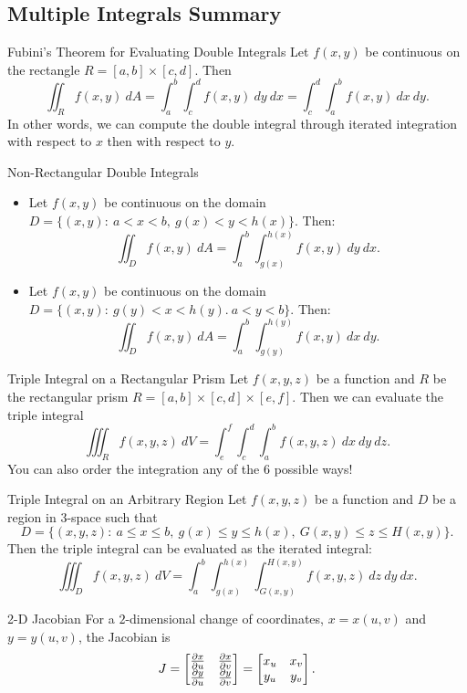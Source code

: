 \renewcommand\thesubsection{\thesection.\Alph{subsection}}
\setcounter{subsection}{18}
\subsection{Multiple Integrals Summary}
\begin{theorem}{Fubini's Theorem for Evaluating Double Integrals}
Let $f(x,y)$ be continuous on the rectangle $R=[a,b]\times[c,d]$. Then $$\iint_R f(x,y)\ dA=\int_{a}^{b}\int_{c}^{d}f(x,y)\ dy\ dx=\int_{c}^{d}\int_{a}^{b}f(x,y)\ dx\ dy.$$ In other words, we can compute the double integral through iterated integration with respect to $x$ then with respect to $y$.
\end{theorem}

\begin{definition}{Non-Rectangular Double Integrals}
\begin{itemize}
\item Let $f(x,y)$ be continuous on the domain $D=\{(x,y):\ a<x<b,\ g(x)<y<h(x) \}.$ Then: $$\iint_D f(x,y)\ dA=\int_{a}^{b}\int_{g(x)}^{h(x)}f(x,y)\ dy \ dx. $$
\item Let $f(x,y)$ be continuous on the domain $D=\{(x,y):\ g(y)<x<h(y).\ a<y<b \}. $ Then: $$\iint_{D}f(x,y)\ dA=\int_{a}^b\int_{g(y)}^{h(y)}f(x,y)\ dx \ dy. $$
\end{itemize}
\end{definition}

\begin{definition}{Triple Integral on a Rectangular Prism}
Let $f(x,y,z)$ be a function and $R$ be the rectangular prism $R=[a,b]\times[c,d]\times[e,f]$. Then we can evaluate the triple integral $$\iiint_R f(x,y,z)\ dV=\int_e^f\int_c^d\int_a^b f(x,y,z) \ dx \ dy \ dz.$$
You can also order the integration any of the 6 possible ways!
\end{definition}

\begin{definition}{Triple Integral on an Arbitrary Region}
Let $f(x,y,z)$ be a function and $D$ be a region in $3$-space such that $$D=\big\{(x,y,z): \ a\leq x\leq b,\ g(x)\leq y\leq h(x),\ G(x,y)\leq z\leq H(x,y)  \big\}.$$ Then the triple integral can be evaluated as the iterated integral: $$\iiint_D f(x,y,z)\ dV=\int_a^b\int_{g(x)}^{h(x)}\int_{G(x,y)}^{H(x,y)}f(x,y,z)\ dz \ dy \ dx. $$
\end{definition}

\begin{definition}{2-D Jacobian}
For a $2$-dimensional change of coordinates, $x=x(u,v)$ and $y=y(u,v)$, the Jacobian is $$J=\begin{bmatrix}\frac{\partial x}{\partial u} & \frac{\partial x}{\partial v} \\ \frac{\partial y}{\partial u} & \frac{\partial y}{\partial v}\end{bmatrix}=\begin{bmatrix}x_u & x_v \\ y_u & y_v\end{bmatrix}.$$
\end{definition}

